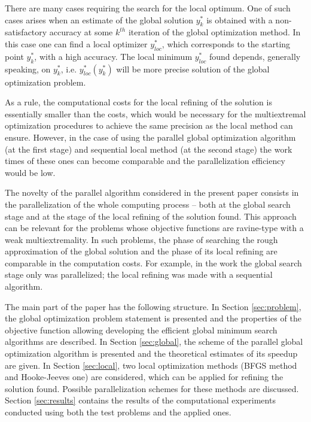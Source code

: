\documentclass[runningheads]{llncs}
\begin{document}
There are many cases requiring the search for the local optimum. One of such cases arises when an estimate of the global solution $y_k^*$ is obtained with a non-satisfactory accuracy at some $k^{th}$ iteration of the global optimization method. In this case one can find a local optimizer $y_{loc}^*$, which corresponds to the starting point $y_k^*$, with a high accuracy. The local minimum $y_{loc}^*$ found depends, generally speaking, on $y_k^*$, i.e. $y_{loc}^*(y_k^*)$ will be more precise solution of the global optimization problem.

As a rule, the computational costs for the local refining of the solution is essentially smaller than the costs, which would be necessary for the multiextremal optimization procedures to achieve the same precision as the local method can ensure. However, in the case of using the parallel global optimization algorithm (at the first stage) and sequential local method (at the second stage) the work times of these ones can become comparable and the parallelization efficiency would be low.

The novelty of the parallel algorithm considered in the present paper consists in the parallelization of the whole computing process -- both at the global search stage and at the stage of the local refining of the solution found. This approach can be relevant for the problems whose objective functions are ravine-type with a weak multiextremality. In such problems, the phase of searching the rough approximation of the global solution and the phase of its local refining are comparable in the computation costs.
For example, in the work \cite{Gubaydullin2021} the global search stage only was parallelized; the local refining was made with a sequential algorithm.

The main part of the paper has the following structure. In Section \ref{sec:problem}, the global optimization problem statement is presented and the properties of the objective function allowing developing the efficient global minimum search algorithms are described. In Section \ref{sec:global}, the scheme of the parallel global optimization algorithm is presented and the theoretical estimates of its speedup are given. In Section \ref{sec:local}, two local optimization methods (BFGS method and Hooke-Jeeves one) are considered, which can be applied for refining the solution found. Possible parallelization schemes for these methods are discussed. Section \ref{sec:results} contains the results of the computational experiments conducted using both the test problems and the applied ones.
\end{document}
